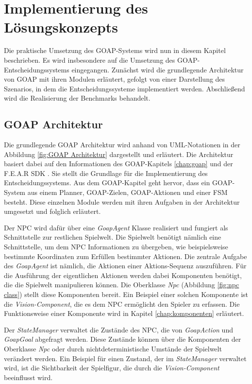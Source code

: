 \chapter{Implementierung des Lösungskonzepts}
\label{chap:implementierung lk}

Die praktische Umsetzung des GOAP-Systems wird nun in diesem Kapitel beschrieben. Es wird insbesondere auf die Umsetzung des GOAP-Entscheidungssystems eingegangen. Zunächst wird die grundlegende Architektur von GOAP mit ihren Modulen erläutert, gefolgt von einer Darstellung des Szenarios, in dem die Entscheidungssysteme implementiert werden. Abschlie\ss{}end wird die Realisierung der Benchmarks behandelt.








\section{GOAP Architektur}
\label{chap:goap architektur}

Die grundlegende GOAP Architektur wird anhand von UML-Notationen in der Abbildung \ref{fig:GOAP Architektur} dargestellt und erläutert. Die Architektur basiert dabei auf den Informationen des GOAP-Kapitels \ref{chap:goap} und der F.E.A.R SDK \autocite{fearsdk}. Sie stellt die Grundlage für die Implementierung des Entscheidungssystems. Aus dem GOAP-Kapitel geht hervor, dass ein GOAP-System aus einem Planner, GOAP-Zielen, GOAP-Aktionen und einer FSM besteht. Diese einzelnen Module werden mit ihren Aufgaben in der Architektur umgesetzt und folglich erläutert.

Der NPC wird dafür über eine \textit{GoapAgent} Klasse realisiert und fungiert als Schnittstelle zur restlichen Spielwelt. Die Spielwelt benötigt nämlich eine Schnittstelle, um dem NPC Informationen zu übergeben, wie beispielsweise bestimmte Koordinaten zum Erfüllen bestimmter Aktionen. Die zentrale Aufgabe des \textit{GoapAgent} ist nämlich, die Aktionen einer Aktions-Sequenz auszuführen. Für die Ausführung der eigentlichen Aktionen werden dabei Komponenten benötigt, die die Spielwelt manipulieren können. Die Oberklasse \textit{Npc} (Abbildung \ref{fig:npc class}) stellt diese Komponenten bereit. Ein Beispiel einer solchen Komponente ist die \textit{Vision-Component}, die es dem NPC ermöglicht den Spieler zu erfassen. Die Funktionsweise einer Komponente wird in Kapitel \ref{chap:komponenten} erläutert.

Der \textit{StateManager} verwaltet die Zustände des NPC, die von \textit{GoapAction} und \textit{GoapGoal} abgefragt werden. Diese Zustände können über die Komponenten der Oberklasse \textit{Npc} oder durch nichtdeterministische Umstände der Spielwelt verändert werden. Ein Beispiel für einen Zustand, der im \textit{StateManager} verwaltet wird, ist die Sichtbarkeit der Spielfigur, die durch die \textit{Vision-Component} beeinflusst wird.

